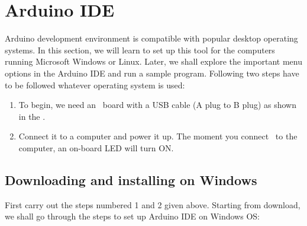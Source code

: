 \section{Arduino IDE}\label{arduino-ide}
\label{sec:ard-start}
Arduino development environment is compatible with popular desktop
operating systems. In this section, we will learn to set up this tool
for the computers running Microsoft Windows or Linux. Later, we shall
explore the important menu options in the Arduino IDE and run a sample
program.  Following two steps have to be followed whatever operating
system is used:

\begin{enumerate}
      \item To begin, we need an \arduino\ board with a USB cable (A plug to
            B plug) as shown in the .
      \item Connect it to a computer and power it up. The moment you connect \arduino\
            to the computer, an on-board LED will turn ON.
\end{enumerate}

\subsection{Downloading and installing on Windows}
First carry out the steps numbered 1 and 2 given above.
Starting from download, we shall go through the steps to set up
Arduino IDE on Windows OS:

